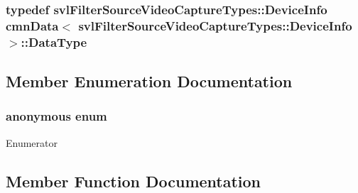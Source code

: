 \subsubsection[{Data\+Type}]{\setlength{\rightskip}{0pt plus 5cm}typedef {\bf svl\+Filter\+Source\+Video\+Capture\+Types\+::\+Device\+Info} {\bf cmn\+Data}$<$ {\bf svl\+Filter\+Source\+Video\+Capture\+Types\+::\+Device\+Info} $>$\+::{\bf Data\+Type}}\label{classcmn_data_3_01svl_filter_source_video_capture_types_1_1_device_info_01_4_afce8b1b6d893ddc5d505f2f1574ac4af}


\subsection{Member Enumeration Documentation}
\hypertarget{classcmn_data_3_01svl_filter_source_video_capture_types_1_1_device_info_01_4_ad534b4c963e58d6f18344d076221d3cf}{}\subsubsection[{anonymous enum}]{\setlength{\rightskip}{0pt plus 5cm}anonymous enum}\label{classcmn_data_3_01svl_filter_source_video_capture_types_1_1_device_info_01_4_ad534b4c963e58d6f18344d076221d3cf}
\begin{Desc}
\item[Enumerator]\par
\begin{description}
\item[{\em 
\hypertarget{classcmn_data_3_01svl_filter_source_video_capture_types_1_1_device_info_01_4_ad534b4c963e58d6f18344d076221d3cfabab1017c2f050ed948aceb6bb647ac49}{}I\+S\+\_\+\+S\+P\+E\+C\+I\+A\+L\+I\+Z\+E\+D\label{classcmn_data_3_01svl_filter_source_video_capture_types_1_1_device_info_01_4_ad534b4c963e58d6f18344d076221d3cfabab1017c2f050ed948aceb6bb647ac49}
}]\end{description}
\end{Desc}


\subsection{Member Function Documentation}
\hypertarget{classcmn_data_3_01svl_filter_source_video_capture_types_1_1_device_info_01_4_a3719c47b34a0bb20eb996135402b3ce3}{}
